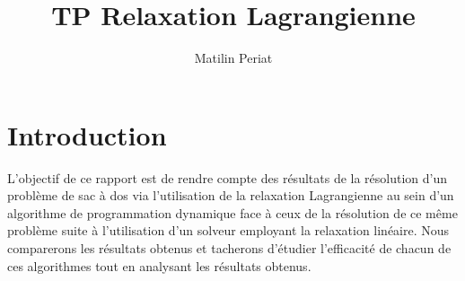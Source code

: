 \documentclass[french,nochapter,11pt]{rapportUB}
\author{ %
	Matilin Periat
}
\begin{document}
	
	\title{TP Relaxation Lagrangienne}
	
	\maketitle
	
	\begin{center}
		\tableofcontents %
		\clearpage
	\end{center}


	\section{Introduction}

	L'objectif de ce rapport est de rendre compte des résultats de la résolution d'un problème de sac à dos
	via l'utilisation de la relaxation Lagrangienne au sein d'un algorithme de programmation dynamique face à 
	ceux de la résolution de ce même problème suite à l'utilisation d'un solveur employant la relaxation linéaire. 
	Nous comparerons les résultats obtenus et tacherons d'étudier l'efficacité de chacun de ces algorithmes tout en 
	analysant les résultats obtenus. 
\end{document}
